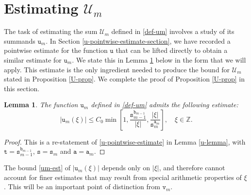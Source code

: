 \documentclass[12pt, twoside]{article}
\newtheorem{lemma}[theorem]{Lemma}
\theoremstyle{definition}
\numberwithin{equation}{section}
\begin{document}
\section{Estimating $\mathcal{U}_m$} \label{estimating-um-section} 
The task of estimating the sum $\mathscr{U}_m$ defined in \eqref{def-um} involves a study of its summands $\mathtt u_m$. In Section \ref{u-pointwise-estimate-section}, we have recorded a pointwise estimate for the function $\mathtt u$ that can be lifted directly to obtain a similar estimate for $\mathtt u_m$. We state this in Lemma \ref{um-est-lemma} below in the form that we will apply. This estimate is the only ingredient needed to produce the bound for $\mathscr{U}_m$ stated in Proposition \ref{U-prop}. We complete the proof of Proposition \ref{U-prop} in this section. 
\begin{lemma} \label{um-est-lemma}
The function $\mathtt u_m$ defined in \eqref{def-um} admits the following estimate:
\begin{equation} \label{um-est}
|\mathtt u_m(\xi)| \leq C_0 \min \left[1, \frac{\mathtt s_{m-1}^{\mathtt b_{m-1}}}{|\xi|}, \frac{|\xi|}{\mathtt s_m^{\mathtt a_m}}\right], \quad \xi \in \mathbb Z. 
\end{equation} 
\end{lemma} 
\begin{proof} 
This is a re-statement of \eqref{u-pointwise-estimate} in Lemma \ref{u-lemma}, with $\mathtt t = \mathtt s_{m-1}^{\mathtt b_{m-1}}$, $\mathtt s = \mathtt s_m$ and $\mathtt a = \mathtt a_m$.   
\end{proof} 
 The bound \eqref{um-est} of $|\mathtt u_m(\xi)|$ depends only on $|\xi|$, and therefore cannot account for finer estimates that may result from special arithmetic properties of $\xi$. 
This will be an important point of distinction from $\mathtt v_m$.  \label{uniform-bound-remark}  
\end{document}
